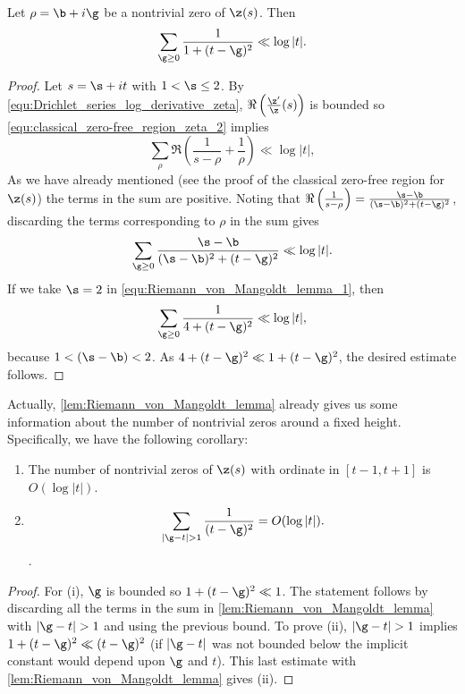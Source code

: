       \begin{lemma}\label{lem:Riemann_von_Mangoldt_lemma}
        Let $\rho = \b+i\g$ be a nontrivial zero of $\z(s)$. Then
        \[
          \sum_{\g \ge 0}\frac{1}{1+(t-\g)^{2}} \ll \log|t|.
        \]
      \end{lemma}
      \begin{proof}
        Let $s = \s+it$ with $1 < \s \le 2$. By \cref{equ:Drichlet_series_log_derivative_zeta}, $\Re\left(\frac{\z'}{\z}(s)\right)$ is bounded so \cref{equ:classical_zero-free_region_zeta_2} implies
        \[
          \sum_{\rho}\Re\left(\frac{1}{s-\rho}+\frac{1}{\rho}\right) \ll \log|t|,
        \]
        As we have already mentioned (see the proof of the classical zero-free region for $\z(s)$) the terms in the sum are positive. Noting that $\Re\left(\frac{1}{s-\rho}\right) = \frac{\s-\b}{(\s-\b)^{2}+(t-\g)^{2}}$, discarding the terms corresponding to $\rho$ in the sum gives
        \begin{equation}\label{equ:Riemann_von_Mangoldt_lemma_1}
          \sum_{\g \ge 0}\frac{\s-\b}{(\s-\b)^{2}+(t-\g)^{2}} \ll \log|t|.
        \end{equation}
        If we take $\s = 2$ in \cref{equ:Riemann_von_Mangoldt_lemma_1}, then
        \[
          \sum_{\g \ge 0}\frac{1}{4+(t-\g)^{2}} \ll \log|t|,
        \]
        because $1 < (\s-\b) < 2$. As $4+(t-\g)^{2} \ll 1+(t-\g)^{2}$, the desired estimate follows.
      \end{proof}

      Actually, \cref{lem:Riemann_von_Mangoldt_lemma} already gives us some information about the number of nontrivial zeros around a fixed height. Specifically, we have the following corollary:

      \begin{corollary}\label{cor:Riemann_von_Mangoldt_corollary}
        \phantom{ }
        \begin{enumerate}[label=(\roman*)]
          \item The number of nontrivial zeros of $\z(s)$ with ordinate in $[t-1,t+1]$ is $O(\log|t|)$.
          \item 
          \[
            \sum_{|\g-t| > 1}\frac{1}{(t-\g)^{2}} = O(\log|t|).
          \].
        \end{enumerate}
      \end{corollary}
      \begin{proof}
        For (i), $\g$ is bounded so $1+(t-\g)^{2} \ll 1$. The statement follows by discarding all the terms in the sum in \cref{lem:Riemann_von_Mangoldt_lemma} with $|\g-t| > 1$ and using the previous bound. To prove (ii), $|\g-t| > 1$ implies $1+(t-\g)^{2} \ll (t-\g)^{2}$ (if $|\g-t|$ was not bounded below the implicit constant would depend upon $\g$ and $t$). This last estimate with \cref{lem:Riemann_von_Mangoldt_lemma} gives (ii).
      \end{proof}

